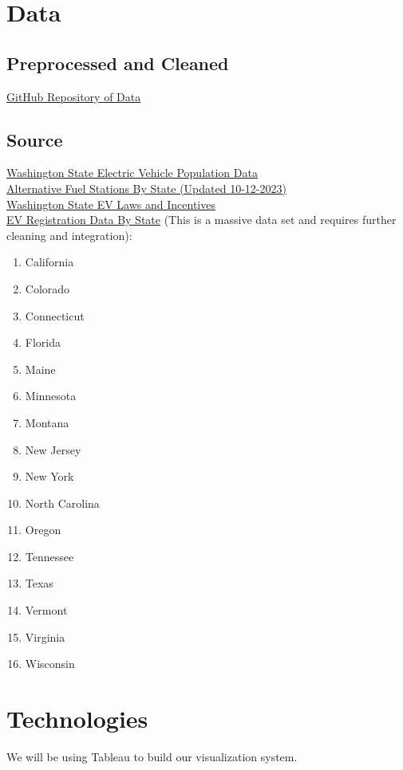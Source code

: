 \documentclass{article}
\begin{document}
\section*{Data}
\subsection*{Preprocessed and Cleaned}
\href{https://github.com/mk-imagine/csc805g5/tree/main/data}{GitHub Repository of Data}
\subsection*{Source}
\href{https://data.wa.gov/Transportation/Electric-Vehicle-Population-Data/f6w7-q2d2}{Washington State Electric Vehicle Population Data}\vspace*{5pt}\\
\href{https://afdc.energy.gov/data_download}{Alternative Fuel Stations By State (Updated 10-12-2023)}\vspace*{5pt}\\
\href{https://afdc.energy.gov/data_download}{Washington State EV Laws and Incentives}\vspace*{5pt}\\
\href{https://www.atlasevhub.com/materials/state-ev-registration-data/}{EV
Registration Data By State} (This is a massive data set and requires further
cleaning and integration):
\begin{multicols}{4}
    \begin{enumerate}[topsep=0pt, partopsep=0pt, itemsep=1pt, parsep=1pt]
        \item California
        \item Colorado
        \item Connecticut
        \item Florida
        \item Maine
        \item Minnesota
        \item Montana
        \item New Jersey
        \item New York
        \item North Carolina
        \item Oregon
        \item Tennessee
        \item Texas
        \item Vermont
        \item Virginia
        \item Wisconsin
    \end{enumerate}
\end{multicols}

\section*{Technologies}
We will be using Tableau to build our visualization system.
\end{document}
